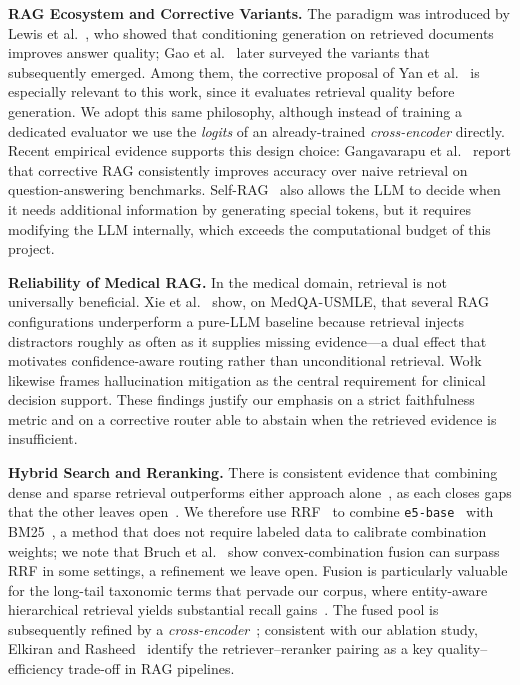 \documentclass[runningheads]{llncs}
\begin{document}
\textbf{RAG Ecosystem and Corrective Variants.} The paradigm was introduced by Lewis et al.~\cite{lewis2020retrieval}, who showed that conditioning generation on retrieved documents improves answer quality; Gao et al.~\cite{gao2024retrieval} later surveyed the variants that subsequently emerged. Among them, the corrective proposal of Yan et al.~\cite{yan2024crag} is especially relevant to this work, since it evaluates retrieval quality before generation. We adopt this same philosophy, although instead of training a dedicated evaluator we use the \emph{logits} of an already-trained \emph{cross-encoder} directly. Recent empirical evidence supports this design choice: Gangavarapu et al.~\cite{gangavarapu2025corrective} report that corrective RAG consistently improves accuracy over naive retrieval on question-answering benchmarks. Self-RAG~\cite{asai2024selfrag} also allows the LLM to decide when it needs additional information by generating special tokens, but it requires modifying the LLM internally, which exceeds the computational budget of this project.

\textbf{Reliability of Medical RAG.} In the medical domain, retrieval is not universally beneficial. Xie et al.~\cite{xie2026retrievalhurts} show, on MedQA-USMLE, that several RAG configurations underperform a pure-LLM baseline because retrieval injects distractors roughly as often as it supplies missing evidence---a dual effect that motivates confidence-aware routing rather than unconditional retrieval. Wo{\l}k~\cite{wolk2025clinical} likewise frames hallucination mitigation as the central requirement for clinical decision support. These findings justify our emphasis on a strict faithfulness metric and on a corrective router able to abstain when the retrieved evidence is insufficient.

\textbf{Hybrid Search and Reranking.} There is consistent evidence that combining dense and sparse retrieval outperforms either approach alone~\cite{karpukhin2020dense}, as each closes gaps that the other leaves open~\cite{sinha2026lexicalsemantic}. We therefore use RRF~\cite{cormack2009rrf} to combine \texttt{e5-base}~\cite{wang2024e5} with BM25~\cite{robertson2009bm25}, a method that does not require labeled data to calibrate combination weights; we note that Bruch et al.~\cite{bruch2023fusion} show convex-combination fusion can surpass RRF in some settings, a refinement we leave open. Fusion is particularly valuable for the long-tail taxonomic terms that pervade our corpus, where entity-aware hierarchical retrieval yields substantial recall gains~\cite{peng2026hce}. The fused pool is subsequently refined by a \emph{cross-encoder}~\cite{nogueira2019passage}; consistent with our ablation study, Elkiran and Rasheed~\cite{elkiran2026rerankerpairings} identify the retriever--reranker pairing as a key quality--efficiency trade-off in RAG pipelines.
\end{document}
